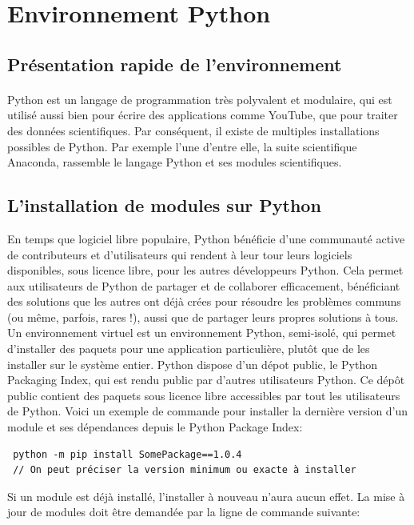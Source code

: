 \documentclass[a4paper,12pt]{article}
\begin{document}
\section{Environnement Python}
\subsection{Présentation rapide de l'environnement}
\paragraph{}
Python est un langage de programmation très polyvalent et modulaire, qui est utilisé aussi bien pour écrire des applications comme YouTube, que pour traiter des données scientifiques. Par conséquent, il existe de multiples installations possibles de Python. Par exemple l'une d'entre elle, la suite scientifique Anaconda, rassemble le langage Python et ses modules scientifiques.

\subsection{L'installation de modules sur Python}
En temps que logiciel libre populaire, Python bénéficie d’une communauté active de contributeurs et d’utilisateurs qui rendent à leur tour leurs logiciels disponibles, sous licence libre, pour les autres développeurs Python.
Cela permet aux utilisateurs de Python de partager et de collaborer efficacement, bénéficiant des solutions que les autres ont déjà crées pour résoudre les problèmes communs (ou même, parfois, rares !), aussi que de partager leurs propres solutions à tous.
Un environnement virtuel est un environnement Python, semi-isolé, qui permet d’installer des paquets pour une application particulière, plutôt que de les installer sur le système entier. Python dispose d'un dépot public, le Python Packaging Index, qui est rendu public par d'autres utilisateurs Python. Ce dépôt public contient des paquets sous licence libre accessibles par tout les utilisateurs de Python.
Voici un exemple de commande pour installer la dernière version d'un module et ses dépendances depuis le Python Package Index:

\begin{verbatim}
 python -m pip install SomePackage==1.0.4 
 // On peut préciser la version minimum ou exacte à installer
\end{verbatim}

Si un module est déjà installé, l'installer à nouveau n'aura aucun effet. La mise à jour de modules doit être demandée par la ligne de commande suivante:
\end{document}
